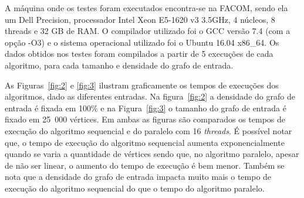 \documentclass[12pt]{article}
\begin{document}
A máquina onde os testes foram executados encontra-se na FACOM, sendo ela um Dell Precision, processador Intel Xeon E5-1620 v3 3.5GHz, 4 núcleos, 8 threads e 32 GB de RAM. O compilador utilizado foi o GCC versão 7.4 (com a opção -O3) e o sistema operacional utilizado foi o Ubuntu 16.04 x86\_64. Os dados obtidos nos testes foram compilados a partir de 5 execuções de cada algoritmo, para cada tamanho e densidade do grafo de entrada.

As Figuras~\ref{fig:2} e \ref{fig:3} ilustram graficamente os tempos de execuções dos algoritmos, dado as diferentes entradas. Na figura~\ref{fig:2} a densidade do grafo de entrada é fixada em 100\% e na Figura~\ref{fig:3} o tamanho do grafo de entrada é fixado em 25~000 vértices. Em ambas as figuras são comparados os tempos de execução do algoritmo sequencial e do paralelo com 16 \emph{threads}. É possível notar que, o tempo de execução do algoritmo sequencial aumenta exponencialmente quando se varia a quantidade de vértices sendo que, no algoritmo paralelo, apesar de não ser linear, o aumento do tempo de execução é bem menor. Também se nota que a densidade do grafo de entrada impacta muito mais o tempo de execução do algoritmo sequencial do que o tempo do algoritmo paralelo.
\end{document}

